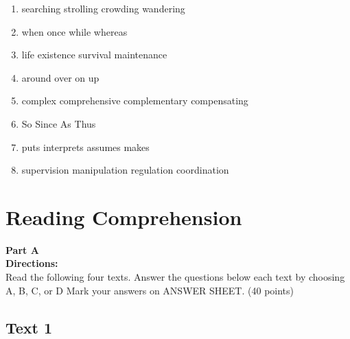 \begin{enumerate}
\item
\fourchoices
{searching}
{strolling}
{crowding}
{wandering}



\item

\fourchoices
{when}
{once}
{while}
{whereas}




\item

\fourchoices
{life}
{existence}
{survival}
{maintenance}




\item

\fourchoices
{around}
{over}
{on}
{up}




\item
\fourchoices
{complex}
{comprehensive}
{complementary}
{compensating}



\item

\fourchoices
{So}
{Since}
{As}
{Thus}




\item

\fourchoices
{puts}
{interprets}
{assumes}
{makes}




\item
\fourchoices
{supervision}
{manipulation}
{regulation}
{coordination}

\end{enumerate}

\vfil

\section{Reading Comprehension}



\noindent
\textbf{Part A}\\
\textbf{Directions:}\\
Read the following four texts. Answer the questions below each
text by choosing A, B, C, or D  Mark your
answers on ANSWER SHEET. (40 points)



\newpage
\subsection{Text 1}


